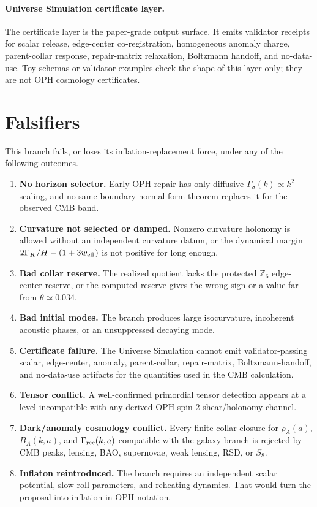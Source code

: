 \documentclass[11pt]{article}
\newcommand{\Zsix}{\mathbb Z_6}
\begin{document}
\paragraph{Universe Simulation certificate layer.}
The certificate layer is the paper-grade output surface. It emits validator receipts for scalar
release, edge-center co-registration, homogeneous anomaly charge, parent-collar response,
repair-matrix relaxation, Boltzmann handoff, and no-data-use. Toy schemas or validator examples
check the shape of this layer only; they are not OPH cosmology certificates.

\section{Falsifiers}

This branch fails, or loses its inflation-replacement force, under any of the following outcomes.

\begin{enumerate}[leftmargin=2em]
\item \textbf{No horizon selector.} Early OPH repair has only diffusive \(\Gamma_\sigma(k)\propto k^2\) scaling, and no same-boundary normal-form theorem replaces it for the observed CMB band.
\item \textbf{Curvature not selected or damped.} Nonzero curvature holonomy is allowed without an independent curvature datum, or the dynamical margin \(2\Gamma_K/H-(1+3w_{\rm eff})\) is not positive for long enough.
\item \textbf{Bad collar reserve.} The realized quotient lacks the protected \(\Zsix\) edge-center reserve, or the computed reserve gives the wrong sign or a value far from \(\theta\simeq0.034\).
\item \textbf{Bad initial modes.} The branch produces large isocurvature, incoherent acoustic phases, or an unsuppressed decaying mode.
\item \textbf{Certificate failure.} The Universe Simulation cannot emit validator-passing scalar,
edge-center, anomaly, parent-collar, repair-matrix, Boltzmann-handoff, and no-data-use artifacts
for the quantities used in the CMB calculation.
\item \textbf{Tensor conflict.} A well-confirmed primordial tensor detection appears at a level incompatible with any derived OPH spin-2 shear/holonomy channel.
\item \textbf{Dark/anomaly cosmology conflict.} Every finite-collar closure for \(\rho_A(a)\), \(B_A(k,a)\), and \(\Gamma_{\rm rec}(k,a)\) compatible with the galaxy branch is rejected by CMB peaks, lensing, BAO, supernovae, weak lensing, RSD, or \(S_8\).
\item \textbf{Inflaton reintroduced.} The branch requires an independent scalar potential, slow-roll parameters, and reheating dynamics. That would turn the proposal into inflation in OPH notation.
\end{enumerate}
\end{document}
